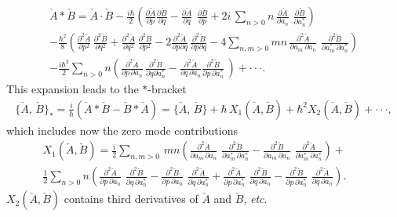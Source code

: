\documentclass[a4paper,12pt]{article}
\begin{document}
\begin{eqnarray}\label{*prh}
{\check A}*{\check B}={\check  A}\cdot{\check  B}
-\frac{i\hbar}{2}\left(\frac{\partial\check  A}{\partial p}
\frac{\partial\check B}{\partial q}-
\frac{\partial\check A}{\partial q}\ \, \frac{\partial \check B}{\partial p}+2i\,
\sum_{n>0}n\,  \frac{\partial \check A}
{\partial a_n}\,\,\frac{\partial \check B}
{\partial a^{*}_n}\right)\nonumber \\
-\frac{\hbar^2}{8}\left(\frac{\partial^2 \check A}
{\partial p^2}\,\frac{\partial^2 \check B}{\partial q^2}
+\frac{\partial^2 \check A}{\partial q^2}\,
\frac{\partial^2 \check B}{\partial p^2}
-2\frac{\partial^2 \check A}{\partial p \partial q}\,\frac{\partial^2 \check B}
{\partial p \partial q}
-4\sum_{n,m>0}mn\,\frac{\partial^2 \check A}
{\partial a_m\,\partial a_n}\,\,\frac{\partial^2 \check B}
{\partial a^{*}_m\,\partial a^{*}_n}\right)
\nonumber\\
-\frac{i\hbar^2}{2}\sum_{n>0}n\left(\frac{\partial^2\check  A}
{\partial p\,\partial a_n}\,\frac{\partial^2 \check B}
{\partial q \partial a^{*}_n}
-\frac{\partial^2 \check A}{\partial q\,\partial a_n}
\frac{\partial^2\check  B}
{\partial p\,
  \partial a^*_n}\,
\right)+\cdot\cdot\cdot .
\end{eqnarray}
This expansion leads to the $*$-bracket
\begin{eqnarray}\label{*-br}
\{{\check A},\,{\check B}\}_*= \frac{i}{\hbar}({\check A}*{\check B}-
{\check B}*{\check A})= \{{\check A},\,{\check B}\} +\hbar\, X_1({\check A},{\check B})
 +\hbar^2X_2({\check A},{\check B})+\cdot\cdot\cdot ,
\end{eqnarray}
which includes now the zero mode
contributions
\begin{eqnarray}\label{*-br-h}
X_1({\check A},{\check B})
=\frac{i}{2}\sum_{n,m>0}\,mn\left(  \frac{\partial^2{\check A}}
{\partial a_m\,\partial a_n}\,\,\frac{\partial^2{\check B}}
{\partial a^{*}_m\,\partial a^{*}_n}-
\frac{\partial^2{\check B}}
{\partial a_m\,\partial a_n}\,\,\frac{\partial^2{\check A}}
{\partial a^{*}_m\,\partial a^{*}_n}\right)+~~~~~~~~\nonumber \\
\frac{1}{2}\sum_{n>0}n\left(
\frac{\partial^2{\check A}}
{\partial p\,\partial a_n}\,\,\frac{\partial^2{\check B}}
{\partial q\,\partial a^{*}_n}-
\frac{\partial^2{\check B}}
{\partial p\,\partial a_n}\,\,\frac{\partial^2{\check A}}
{\partial q\,\partial a^{*}_n}+
\frac{\partial^2{\check A}}
{\partial p\,\partial a_n^*}\,\,\frac{\partial^2{\check B}}
{\partial q\,\partial a_n}-
\frac{\partial^2{\check B}}
{\partial p\,\partial a^*_n}\,\,\frac{\partial^2{\check A}}
{\partial q\,\partial a_n}\right).
\end{eqnarray}
$X_2({\check A},{\check B})$ contains third derivatives of
$\check A$ and $\check B$, {\it etc}.
\end{document}
